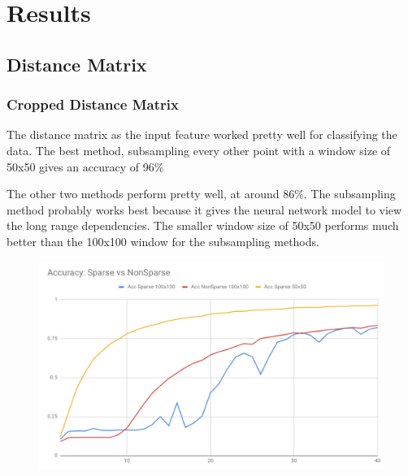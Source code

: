 \documentclass[12pt, a4paper, twocolumn, fullpage]{article}
\theoremstyle{plain}
\theoremstyle{definition}
\theoremstyle{remark}
\begin{document}
\section{Results}

\subsection{Distance Matrix}

\subsubsection{Cropped Distance Matrix}
    The distance matrix as the input feature worked pretty well for classifying the data. The best method, subsampling every other point with a window size of 50x50 gives an accuracy of 96\%
    
    The other two methods perform pretty well, at around 86\%.
    The subsampling method probably works best because it gives the neural network model to view the long range dependencies.
    The smaller window size of 50x50 performs much better than the 100x100 window for the subsampling methods.  
    
    \begin{figure}[t]
      \includegraphics[width=\linewidth]{AccSparsevsNonSparse.png}
      \caption{}
      \label{AccSparsevsNonSparse}
    \end{figure}
    
\end{document}
